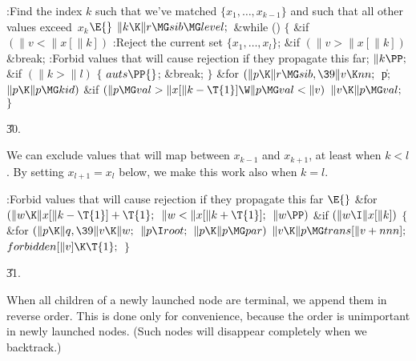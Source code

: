 \B{}:Find the index $k$ such that we've matched $\{x_1,\ldots,x_{k-1}%
\}$ and such that all other values exceed~$x_k$\X${}\E{}$\6
$\|k\K\|r\MG\\{sib}\MG\\{level};{}$\6
\&{while} ()\5
${}\{{}$\1\6
\&{if} ${}(\|v<\|x[\|k]){}$\1\5
:Reject the current set $\{x_1,\ldots,x_l\}$\X;\2\6
\&{if} ${}(\|v>\|x[\|k]){}$\1\5
\&{break};\2\6
:Forbid values that will cause rejection if they propagate this far\X;\6
${}\|k\PP;{}$\6
\&{if} ${}(\|k>\|l){}$\5
${}\{{}$\1\6
${}\\{auts}\PP{}$;\6
\&{break};\6
\4${}\}{}$\2\6
\&{for} ${}(\|p\K\|r\MG\\{sib},\39\|v\K\\{nn};{}$ \|p; ${}\|p\K\|p\MG%
\\{kid}){}$\1\6
\&{if} ${}(\|p\MG\\{val}>\|x[\|k-\T{1}]\W\|p\MG\\{val}<\|v){}$\1\5
${}\|v\K\|p\MG\\{val};{}$\2\2\6
\4${}\}{}$\2\par
\U30.\fi

We can exclude values that will map between $x_{k-1}$ and $x_{k+1}$,
at least when $k<l$. By setting $x_{l+1}=x_l$ below, we make this
work also when $k=l$.

\Y\B\4:Forbid values that will cause rejection if they propagate this far%
\X${}\E{}$\6
\&{for} ${}(\|w\K\|x[\|k-\T{1}]+\T{1};{}$ ${}\|w<\|x[\|k+\T{1}];{}$ ${}\|w%
\PP){}$\1\6
\&{if} ${}(\|w\I\|x[\|k]){}$\5
${}\{{}$\1\6
\&{for} ${}(\|p\K\|q,\39\|v\K\|w;{}$ ${}\|p\I\\{root};{}$ ${}\|p\K\|p\MG%
\\{par}){}$\1\5
${}\|v\K\|p\MG\\{trans}[\|v+\\{nnn}];{}$\2\6
${}\\{forbidden}[\|v]\K\T{1};{}$\6
\4${}\}{}$\2\2\par
\U31.\fi

When all children of a newly launched node  are terminal,
we append them in reverse order. This is done only for convenience,
because the order
is unimportant in newly launched nodes. (Such nodes will disappear completely
when we backtrack.)

